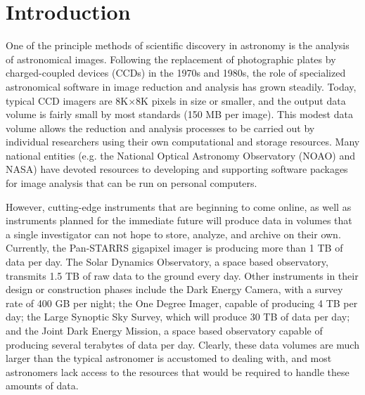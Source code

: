 \documentclass[10pt,conference]{IEEEtran}
\begin{document}
%
\IEEEpeerreviewmaketitle

\section{Introduction}\label{sec:intro}

One of the principle methods of scientific discovery in astronomy is the analysis of astronomical images. Following the replacement of photographic plates by charged-coupled devices (CCDs) in the 1970s and 1980s, the role of specialized astronomical software in image reduction and analysis has grown steadily. Today, typical CCD imagers are 8K$\times$8K pixels in size or smaller, and the output data volume is fairly small by most standards (150 MB per image). This modest data volume allows the reduction and analysis processes to be carried out by individual researchers using their own computational and storage resources. Many national entities (e.g. the National Optical Astronomy Observatory (NOAO) and NASA) have devoted resources to developing and supporting software packages for image analysis that can be run on personal computers.  

However, cutting-edge instruments that are beginning to come online, as well as instruments planned for the immediate future will produce data in volumes that a single investigator can not hope to store, analyze, and archive on their own. Currently, the Pan-STARRS gigapixel imager is producing more than 1 TB of data per day. The Solar Dynamics Observatory, a space based observatory, transmits 1.5 TB of raw data to the ground every day. Other instruments in their design or construction phases include the Dark Energy Camera, with a survey rate of 400 GB per night; the One Degree Imager, capable of producing 4 TB per day; the Large Synoptic Sky Survey, which will produce 30 TB of data per day; and the Joint Dark Energy Mission, a space based observatory capable of producing several terabytes of data per day. Clearly, these data volumes are much larger than the typical astronomer is accustomed to dealing with, and most astronomers lack access to the resources that would be required to handle these amounts of data.
\end{document}
